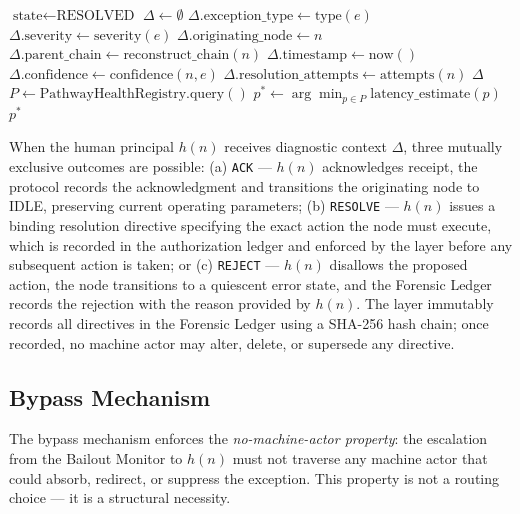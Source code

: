 \begin{algorithm}[htbp]
\begin{algorithmic}[1]
\State $\text{state} \gets \text{RESOLVED}$ 
\Statex
\EndIf
\EndProcedure
\Statex
{}
\State $\Delta \gets \emptyset$
\State $\Delta.\text{exception\_type} \gets \text{type}(e)$
\State $\Delta.\text{severity} \gets \text{severity}(e)$
\State $\Delta.\text{originating\_node} \gets n$
\State $\Delta.\text{parent\_chain} \gets \text{reconstruct\_chain}(n)$ 
\State $\Delta.\text{timestamp} \gets \text{now}()$
\State $\Delta.\text{confidence} \gets \text{confidence}(n, e)$
\State $\Delta.\text{resolution\_attempts} \gets \text{attempts}(n)$ 
\State \Return $\Delta$
\EndProcedure
\Statex
{}
\State $P \gets \text{PathwayHealthRegistry.query}()$ 
\State $p^* \gets \arg\min_{p \in P} \text{latency\_estimate}(p)$ 
\State \Return $p^*$
\EndProcedure
\end{algorithmic}
\end{algorithm}

When the human principal $h(n)$ receives diagnostic context $\Delta$, three mutually exclusive outcomes are possible: (a) \texttt{ACK} — $h(n)$ acknowledges receipt, the protocol records the acknowledgment and transitions the originating node to IDLE, preserving current operating parameters; (b) \texttt{RESOLVE} — $h(n)$ issues a binding resolution directive specifying the exact action the node must execute, which is recorded in the authorization ledger and enforced by the \fact{} layer before any subsequent action is taken; or (c) \texttt{REJECT} — $h(n)$ disallows the proposed action, the node transitions to a quiescent error state, and the Forensic Ledger records the rejection with the reason provided by $h(n)$. The \fact{} layer immutably records all directives in the Forensic Ledger using a SHA-256 hash chain; once recorded, no machine actor may alter, delete, or supersede any directive.

\subsection{Bypass Mechanism}\label{sec:bypass-mechanism}

The bypass mechanism enforces the \emph{no-machine-actor property}: the escalation from the Bailout Monitor to $h(n)$ must not traverse any machine actor that could absorb, redirect, or suppress the exception. This property is not a routing choice — it is a structural necessity.

